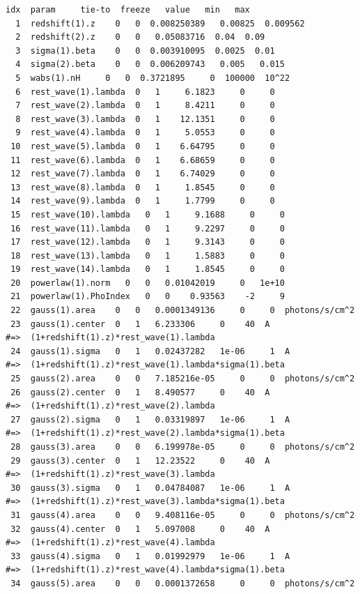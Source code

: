 \lstset{basicstyle=\footnotesize\ttfamily,breaklines=true}
\begin{lstlisting}[breaklines]
  idx  param     tie-to  freeze   value   min   max
  1  redshift(1).z    0   0  0.008250389   0.00825  0.009562  
  2  redshift(2).z    0   0   0.05083716  0.04  0.09  
  3  sigma(1).beta    0   0  0.003910095  0.0025  0.01  
  4  sigma(2).beta    0   0  0.006209743   0.005   0.015  
  5  wabs(1).nH     0   0  0.3721895     0  100000  10^22
  6  rest_wave(1).lambda  0   1     6.1823     0     0  
  7  rest_wave(2).lambda  0   1     8.4211     0     0  
  8  rest_wave(3).lambda  0   1    12.1351     0     0  
  9  rest_wave(4).lambda  0   1     5.0553     0     0  
 10  rest_wave(5).lambda  0   1    6.64795     0     0  
 11  rest_wave(6).lambda  0   1    6.68659     0     0  
 12  rest_wave(7).lambda  0   1    6.74029     0     0  
 13  rest_wave(8).lambda  0   1     1.8545     0     0  
 14  rest_wave(9).lambda  0   1     1.7799     0     0  
 15  rest_wave(10).lambda   0   1     9.1688     0     0  
 16  rest_wave(11).lambda   0   1     9.2297     0     0  
 17  rest_wave(12).lambda   0   1     9.3143     0     0  
 18  rest_wave(13).lambda   0   1     1.5883     0     0  
 19  rest_wave(14).lambda   0   1     1.8545     0     0  
 20  powerlaw(1).norm   0   0   0.01042019     0   1e+10  
 21  powerlaw(1).PhoIndex   0   0    0.93563    -2     9  
 22  gauss(1).area    0   0   0.0001349136     0     0  photons/s/cm^2
 23  gauss(1).center  0   1   6.233306     0    40  A
#=>  (1+redshift(1).z)*rest_wave(1).lambda
 24  gauss(1).sigma   0   1   0.02437282   1e-06     1  A
#=>  (1+redshift(1).z)*rest_wave(1).lambda*sigma(1).beta
 25  gauss(2).area    0   0   7.185216e-05     0     0  photons/s/cm^2
 26  gauss(2).center  0   1   8.490577     0    40  A
#=>  (1+redshift(1).z)*rest_wave(2).lambda
 27  gauss(2).sigma   0   1   0.03319897   1e-06     1  A
#=>  (1+redshift(1).z)*rest_wave(2).lambda*sigma(1).beta
 28  gauss(3).area    0   0   6.199978e-05     0     0  photons/s/cm^2
 29  gauss(3).center  0   1   12.23522     0    40  A
#=>  (1+redshift(1).z)*rest_wave(3).lambda
 30  gauss(3).sigma   0   1   0.04784087   1e-06     1  A
#=>  (1+redshift(1).z)*rest_wave(3).lambda*sigma(1).beta
 31  gauss(4).area    0   0   9.408116e-05     0     0  photons/s/cm^2
 32  gauss(4).center  0   1   5.097008     0    40  A
#=>  (1+redshift(1).z)*rest_wave(4).lambda
 33  gauss(4).sigma   0   1   0.01992979   1e-06     1  A
#=>  (1+redshift(1).z)*rest_wave(4).lambda*sigma(1).beta
 34  gauss(5).area    0   0   0.0001372658     0     0  photons/s/cm^2

\end{lstlisting}
